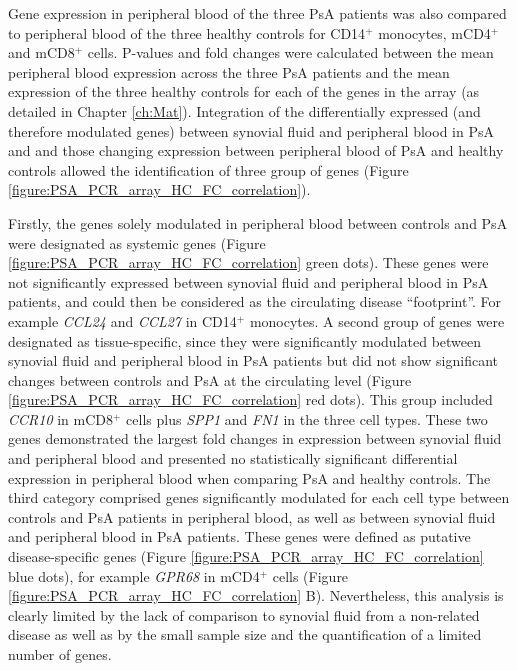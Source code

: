 Gene expression in peripheral blood of the three PsA patients was also compared to peripheral blood of the three healthy controls for CD14$^+$ monocytes, mCD4$^+$ and mCD8$^+$ cells. P-values and fold changes were calculated between the mean peripheral blood expression across the three PsA patients and the mean expression of the three healthy controls for each of the genes in the array (as detailed in Chapter \ref{ch:Mat}). Integration of the differentially expressed (and therefore modulated genes) between synovial fluid and peripheral blood in PsA and and those changing expression between peripheral blood of PsA and healthy controls allowed the identification of three group of genes (Figure \ref{figure:PSA_PCR_array_HC_FC_correlation}). 

Firstly, the genes solely modulated in peripheral blood between controls and PsA were designated as systemic genes (Figure \ref{figure:PSA_PCR_array_HC_FC_correlation} green dots). These genes were not significantly expressed between synovial fluid and peripheral blood in PsA patients, and could then be considered as the circulating disease ``footprint''. For example \textit{CCL24} and \textit{CCL27} in CD14$^+$ monocytes. A second group of genes were designated as tissue-specific, since they were significantly modulated between synovial fluid and peripheral blood in PsA patients but did not show significant changes between controls and PsA at the circulating level (Figure \ref{figure:PSA_PCR_array_HC_FC_correlation} red dots). This group included \textit{CCR10} in mCD8$^+$ cells plus \textit{SPP1} and \textit{FN1} in the three cell types. These two genes demonstrated the largest fold changes in expression between synovial fluid and peripheral blood and presented no statistically significant differential expression in peripheral blood when comparing PsA and healthy controls. The third category comprised genes significantly modulated for each cell type between controls and PsA patients in peripheral blood, as well as between synovial fluid and peripheral blood in PsA patients. These genes were defined as putative disease-specific genes (Figure \ref{figure:PSA_PCR_array_HC_FC_correlation} blue dots), for example \textit{GPR68} in mCD4$^+$ cells (Figure \ref{figure:PSA_PCR_array_HC_FC_correlation} B). Nevertheless, this analysis is clearly limited by the lack of comparison to synovial fluid from a non-related disease as well as by the small sample size and the quantification of a limited number of genes.


